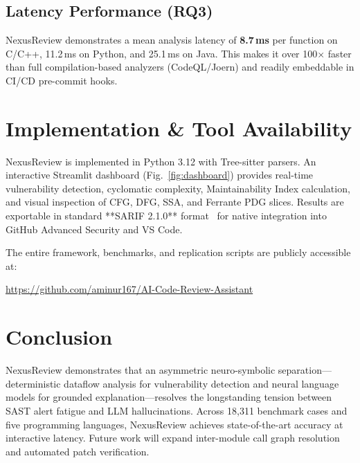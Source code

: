 \documentclass[10pt,conference]{IEEEtran}
\begin{document}
\subsection{Latency Performance (RQ3)}
NexusReview demonstrates a mean analysis latency of \textbf{8.7\,ms} per function on C/C++, 11.2\,ms on Python, and 25.1\,ms on Java. This makes it over 100$\times$ faster than full compilation-based analyzers (CodeQL/Joern) and readily embeddable in CI/CD pre-commit hooks.

\section{Implementation \& Tool Availability}

NexusReview is implemented in Python 3.12 with Tree-sitter parsers. An interactive Streamlit dashboard (Fig.~\ref{fig:dashboard}) provides real-time vulnerability detection, cyclomatic complexity, Maintainability Index calculation, and visual inspection of CFG, DFG, SSA, and Ferrante PDG slices. Results are exportable in standard **SARIF 2.1.0** format~\cite{sarif} for native integration into GitHub Advanced Security and VS Code.

The entire framework, benchmarks, and replication scripts are publicly accessible at:
\begin{center}
\url{https://github.com/aminur167/AI-Code-Review-Assistant}
\end{center}

\section{Conclusion}

NexusReview demonstrates that an asymmetric neuro-symbolic separation—deterministic dataflow analysis for vulnerability detection and neural language models for grounded explanation—resolves the longstanding tension between SAST alert fatigue and LLM hallucinations. Across 18{,}311 benchmark cases and five programming languages, NexusReview achieves state-of-the-art accuracy at interactive latency. Future work will expand inter-module call graph resolution and automated patch verification.
\end{document}
